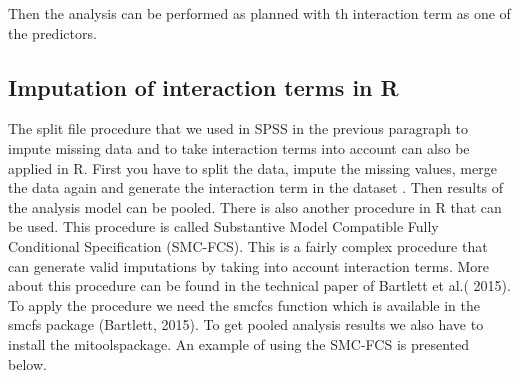 \documentclass[]{book}
\newenvironment{Shaded}{\begin{snugshade}}{\end{snugshade}}
\newcommand{\CommentTok}[1]{\textcolor[rgb]{0.56,0.35,0.01}{\textit{#1}}}
\begin{document}
Then the analysis can be performed as planned with th interaction term
as one of the predictors.

\subsection{Imputation of interaction terms in
R}\label{imputation-of-interaction-terms-in-r}

The split file procedure that we used in SPSS in the previous paragraph
to impute missing data and to take interaction terms into account can
also be applied in R. First you have to split the data, impute the
missing values, merge the data again and generate the interaction term
in the dataset . Then results of the analysis model can be pooled. There
is also another procedure in R that can be used. This procedure is
called Substantive Model Compatible Fully Conditional Specification
(SMC-FCS). This is a fairly complex procedure that can generate valid
imputations by taking into account interaction terms. More about this
procedure can be found in the technical paper of Bartlett et al.( 2015).
To apply the procedure we need the smcfcs function which is available in
the smcfs package (Bartlett, 2015). To get pooled analysis results we
also have to install the mitoolspackage. An example of using the SMC-FCS
is presented below.

\begin{Shaded}
\end{Shaded}
\end{document}
